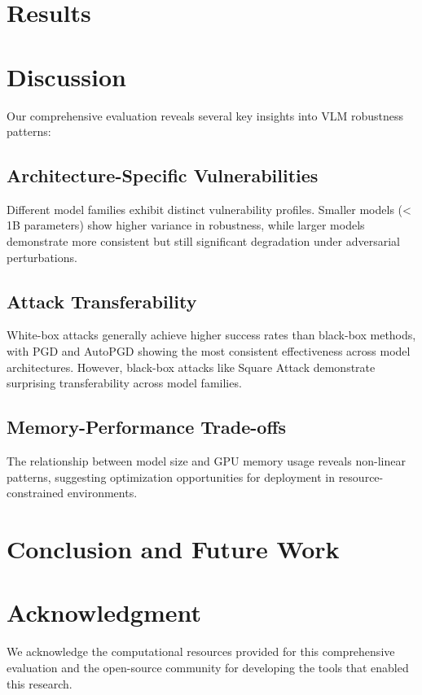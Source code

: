 \documentclass[10pt,twocolumn]{article}
\begin{document}
\section{Results}


\section{Discussion}
\label{sec:discussion}

Our comprehensive evaluation reveals several key insights into VLM robustness patterns:

\subsection{Architecture-Specific Vulnerabilities}
Different model families exhibit distinct vulnerability profiles. Smaller models (< 1B parameters) show higher variance in robustness, while larger models demonstrate more consistent but still significant degradation under adversarial perturbations.

\subsection{Attack Transferability}
White-box attacks generally achieve higher success rates than black-box methods, with PGD and AutoPGD showing the most consistent effectiveness across model architectures. However, black-box attacks like Square Attack demonstrate surprising transferability across model families.

\subsection{Memory-Performance Trade-offs}
The relationship between model size and GPU memory usage reveals non-linear patterns, suggesting optimization opportunities for deployment in resource-constrained environments.

\section{Conclusion and Future Work}


\section*{Acknowledgment}
We acknowledge the computational resources provided for this comprehensive evaluation and the open-source community for developing the tools that enabled this research.



\end{document}
